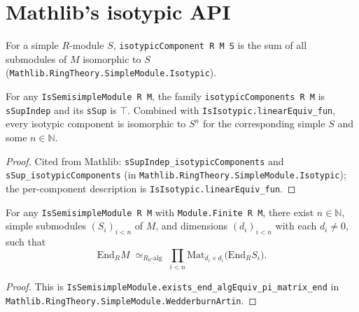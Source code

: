 \section{Mathlib's isotypic API}

\begin{definition}
  \label{def:isotypicComponent}
  \mathlibok
  For a simple $R$-module $S$, \texttt{isotypicComponent R M S} is the sum
  of all submodules of $M$ isomorphic to $S$
  (\texttt{Mathlib.RingTheory.SimpleModule.Isotypic}).
\end{definition}

\begin{theorem}
  \label{thm:isotypic-decomp}
  \mathlibok
  \leanok
  For any \texttt{IsSemisimpleModule R M}, the family
  \texttt{isotypicComponents R M} is \texttt{sSupIndep} and its \texttt{sSup}
  is $\top$. Combined with \texttt{IsIsotypic.linearEquiv\_fun}, every
  isotypic component is isomorphic to $S^n$ for the corresponding simple $S$
  and some $n \in \mathbb N$.
\end{theorem}

\begin{proof}\leanok{}
  Cited from Mathlib: \texttt{sSupIndep\_isotypicComponents} and
  \texttt{sSup\_isotypicComponents} (in
  \texttt{Mathlib.RingTheory.SimpleModule.Isotypic}); the per-component
  description is \texttt{IsIsotypic.linearEquiv\_fun}.
\end{proof}

\begin{corollary}
  \label{cor:moduleForm-PeterWeyl-Mathlib}
  \mathlibok
  \leanok
  For any \texttt{IsSemisimpleModule R M} with \texttt{Module.Finite R M},
  there exist $n \in \mathbb N$, simple submodules
  $(S_i)_{i < n}$ of $M$, and dimensions $(d_i)_{i < n}$ with each
  $d_i \ne 0$, such that
  \[
     \mathrm{End}_R M \;\simeq_{R_0\text{-alg}}\;
     \prod_{i < n} \mathrm{Mat}_{d_i \times d_i}\bigl(\mathrm{End}_R S_i\bigr).
  \]
\end{corollary}

\begin{proof}\leanok{}
  This is \texttt{IsSemisimpleModule.exists\_end\_algEquiv\_pi\_matrix\_end}
  in \texttt{Mathlib.RingTheory.SimpleModule.WedderburnArtin}.
\end{proof}


